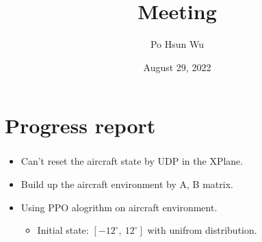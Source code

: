 \documentclass{beamer}
\date{August 29, 2022}
\title{Meeting}
\author{Po Hsun Wu}
\begin{document}
    \maketitle

    \section{Progress report}
    \begin{frame}
        \frametitle{\secname}

        \begin{multicols}{2}
            \begin{itemize}
                \footnotesize
                \item Can't reset the aircraft state by UDP in the XPlane.
                \item Build up the aircraft environment by A, B matrix.
                \item Using PPO alogrithm on aircraft environment.
                \begin{itemize}
                    \scriptsize
                    \item Initial state: $[-12^\circ,\ 12^\circ]$ with unifrom distribution.
                \end{itemize}
                \vfill
            \end{itemize}
            \columnbreak


\end{multicols}
\end{frame}
\end{document}
